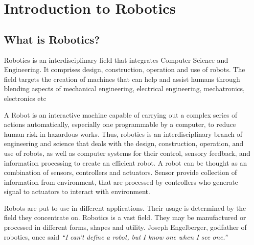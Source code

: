 \chapter{Introduction to Robotics}

\section{What is Robotics?}
\par Robotics is an interdisciplinary field that integrates Computer Science and Engineering. It comprises design, construction, operation and use of robots. The field targets the creation of machines that can help and assist humans through blending aspects of mechanical engineering, electrical engineering, mechatronics, electronics etc
\par A Robot is an interactive machine capable of carrying out a complex series of actions automatically, especially one programmable by a computer, to reduce human risk in hazardous works. Thus, robotics is an interdisciplinary branch of engineering and science that deals with the design, construction, operation, and use of robots, as well as computer systems for their control, sensory feedback, and information processing to create an efficient robot. A robot can be thought as an combination of sensors, controllers and actuators. Sensor provide collection of information from environment, that are processed by controllers who generate signal to actuators to interact with environment.
\par Robots are put to use in different applications. Their usage is determined by the field they concentrate on. Robotics is a vast field. They may be manufactured or processed in different forms, shapes and utility. Joseph Engelberger, godfather of robotics, once said \textit{“I can't define a robot, but I know one when I see one.”}

